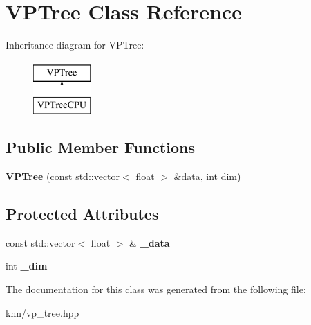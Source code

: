 \hypertarget{classVPTree}{}\section{V\+P\+Tree Class Reference}
\label{classVPTree}
Inheritance diagram for V\+P\+Tree\+:\begin{figure}[H]
\begin{center}
\leavevmode
\includegraphics[height=2.000000cm]{classVPTree}
\end{center}
\end{figure}
\subsection*{Public Member Functions}
\begin{DoxyCompactItemize}
\item 
\hypertarget{classVPTree_aeac6b50747fdf3e85bf029460b6a1693}{}{\bfseries V\+P\+Tree} (const std\+::vector$<$ float $>$ \&data, int dim)\label{classVPTree_aeac6b50747fdf3e85bf029460b6a1693}

\end{DoxyCompactItemize}
\subsection*{Protected Attributes}
\begin{DoxyCompactItemize}
\item 
\hypertarget{classVPTree_ad6448be4cdc0e650706d1d99741b35c2}{}const std\+::vector$<$ float $>$ \& {\bfseries \+\_\+data}\label{classVPTree_ad6448be4cdc0e650706d1d99741b35c2}

\item 
\hypertarget{classVPTree_ac1aa451a8af463c442d3791d918bced6}{}int {\bfseries \+\_\+dim}\label{classVPTree_ac1aa451a8af463c442d3791d918bced6}

\end{DoxyCompactItemize}


The documentation for this class was generated from the following file\+:\begin{DoxyCompactItemize}
\item 
knn/vp\+\_\+tree.\+hpp\end{DoxyCompactItemize}
